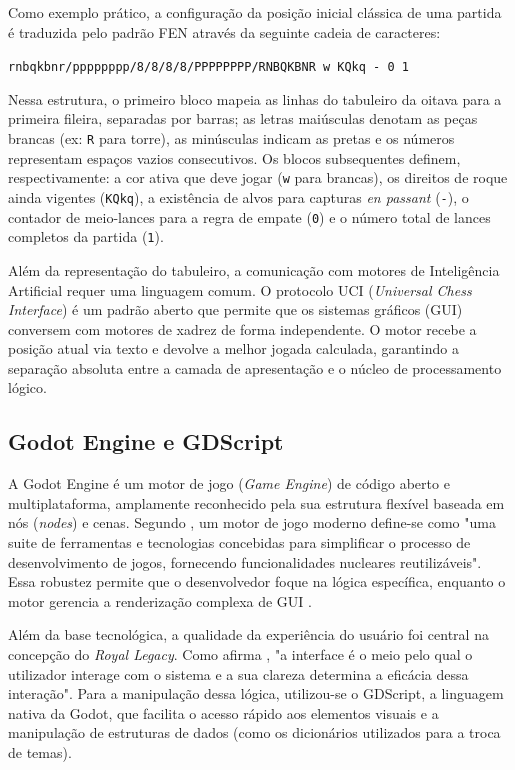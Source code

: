 Como exemplo prático, a configuração da posição inicial clássica de uma partida é traduzida pelo padrão FEN através da seguinte cadeia de caracteres:

\begin{center}
	\texttt{rnbqkbnr/pppppppp/8/8/8/8/PPPPPPPP/RNBQKBNR w KQkq - 0 1}
\end{center}

Nessa estrutura, o primeiro bloco mapeia as linhas do tabuleiro da oitava para a primeira fileira, separadas por barras; as letras maiúsculas denotam as peças brancas (ex: \texttt{R} para torre), as minúsculas indicam as pretas e os números representam espaços vazios consecutivos. Os blocos subsequentes definem, respectivamente: a cor ativa que deve jogar (\texttt{w} para brancas), os direitos de roque ainda vigentes (\texttt{KQkq}), a existência de alvos para capturas \textit{en passant} (\texttt{-}), o contador de meio-lances para a regra de empate (\texttt{0}) e o número total de lances completos da partida (\texttt{1}).

Além da representação do tabuleiro, a comunicação com motores de Inteligência Artificial requer uma linguagem comum. O protocolo UCI (\textit{Universal Chess Interface}) é um padrão aberto que permite que os sistemas gráficos (GUI) conversem com motores de xadrez de forma independente. O motor recebe a posição atual via texto e devolve a melhor jogada calculada, garantindo a separação absoluta entre a camada de apresentação e o núcleo de processamento lógico.

\subsection{Godot Engine e GDScript}

A Godot Engine é um motor de jogo (\textit{Game Engine}) de código aberto e multiplataforma, amplamente reconhecido pela sua estrutura flexível baseada em nós (\textit{nodes}) e cenas. Segundo , um motor de jogo moderno define-se como "uma suite de ferramentas e tecnologias concebidas para simplificar o processo de desenvolvimento de jogos, fornecendo funcionalidades nucleares reutilizáveis". Essa robustez permite que o desenvolvedor foque na lógica específica, enquanto o motor gerencia a renderização complexa de GUI \cite{Linietsky2023}.

Além da base tecnológica, a qualidade da experiência do usuário foi central na concepção do \textit{Royal Legacy}. Como afirma , "a interface é o meio pelo qual o utilizador interage com o sistema e a sua clareza determina a eficácia dessa interação". Para a manipulação dessa lógica, utilizou-se o GDScript, a linguagem nativa da Godot, que facilita o acesso rápido aos elementos visuais e a manipulação de estruturas de dados (como os dicionários utilizados para a troca de temas).

